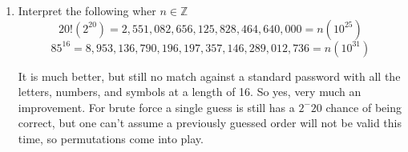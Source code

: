 \documentclass{article}
\begin{document}
\begin{enumerate}
{      No. Just a basic eight character password consisting of upper/lowercase letters, numbers and three symbols (base 64 encoding) garnered a $10^8$ times larger space.}
    \item {
      Interpret the following wher $n\in\mathbb{Z}$
      \begin{equation}
        20!(2^{20}) = 2,551,082,656,125,828,464,640,000 = n(10^{25})
      \end{equation}
      \begin{equation}
        85^{16} = 8,953,136,790,196,197,357,146,289,012,736 = n(10^{31})
      \end{equation}

    It is much better, but still no match against a standard password with all the letters, numbers, and symbols at a length of 16. So yes, very much an improvement. For brute force a single guess is still has a $2^-20$ chance of being correct, but one can't assume a previously guessed order will not be valid this time, so permutations come into play.}

  \end{enumerate}
\end{document}
